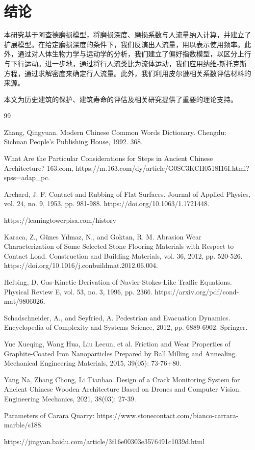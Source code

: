 \documentclass[11pt,a4paper]{ctexart}
\begin{document}
\section{结论}

本研究基于阿查德磨损模型，将磨损深度、磨损系数与人流量纳入计算，并建立了扩展模型。在给定磨损深度的条件下，我们反演出人流量，用以表示使用频率。此外，通过对人体生物力学与运动学的分析，我们建立了偏好指数模型，以区分上行与下行运动。进一步地，通过将行人流类比为流体运动，我们应用纳维-斯托克斯方程，通过求解密度来确定行人流量。此外，我们利用皮尔逊相关系数评估材料的来源。

本文为历史建筑的保护、建筑寿命的评估及相关研究提供了重要的理论支持。

\newpage
\begin{thebibliography}{99}
\setlength{\itemsep}{2pt}

 Zhang, Qingyuan. Modern Chinese Common Words Dictionary. Chengdu: Sichuan People's Publishing House, 1992. 368.

 What Are the Particular Considerations for Steps in Ancient Chinese Architecture? 163.com, https://m.163.com/dy/article/G0SC3KCH0518I16I.html?spss=adap\_pc.

 Archard, J. F. Contact and Rubbing of Flat Surfaces. Journal of Applied Physics, vol. 24, no. 9, 1953, pp. 981-988. https://doi.org/10.1063/1.1721448.

 https://leaningtowerpisa.com/history

 Karaca, Z., Günes Yılmaz, N., and Goktan, R. M. Abrasion Wear Characterization of Some Selected Stone Flooring Materials with Respect to Contact Load. Construction and Building Materials, vol. 36, 2012, pp. 520-526. https://doi.org/10.1016/j.conbuildmat.2012.06.004.

 Helbing, D. Gas-Kinetic Derivation of Navier-Stokes-Like Traffic Equations. Physical Review E, vol. 53, no. 3, 1996, pp. 2366. https://arxiv.org/pdf/cond-mat/9806026.

 Schadschneider, A., and Seyfried, A. Pedestrian and Evacuation Dynamics. Encyclopedia of Complexity and Systems Science, 2012, pp. 6889-6902. Springer.

 Yue Xueqing, Wang Hua, Liu Lecun, et al. Friction and Wear Properties of Graphite-Coated Iron Nanoparticles Prepared by Ball Milling and Annealing. Mechanical Engineering Materials, 2015, 39(05): 73-76+80.

 Yang Na, Zhang Chong, Li Tianhao. Design of a Crack Monitoring System for Ancient Chinese Wooden Architecture Based on Drones and Computer Vision. Engineering Mechanics, 2021, 38(03): 27-39.

 Parameters of Carara Quarry: https://www.stonecontact.com/bianco-carrara-marble/s188.

 https://jingyan.baidu.com/article/3f16e00303e3576491c1039d.html

\end{thebibliography}
\end{document}
